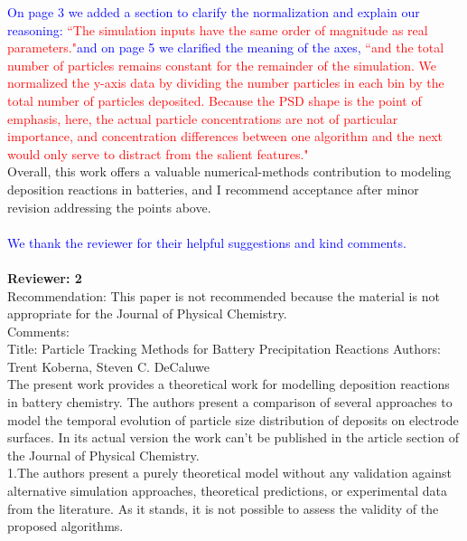 \documentclass[12 pt]{article}    %
\begin{document}
\noindent\textcolor{blue}{On page 3 we added a section to clarify the normalization and explain our reasoning:} \textcolor{red}{``The simulation inputs have the same order of magnitude as real parameters."}\textcolor{blue}{and on page 5 we clarified the meaning of the axes,}\textcolor{red}{ ``and the total number of particles remains constant for the remainder of the simulation. We normalized the y-axis data by dividing the number particles in each bin by the total number of particles deposited. Because the PSD shape is the point of emphasis, here, the actual particle concentrations are not of particular importance, and concentration differences between one algorithm and the next would only serve to distract from the salient features."}
\\

\noindent Overall, this work offers a valuable numerical-methods contribution to modeling deposition reactions in batteries, and I recommend acceptance after minor revision addressing the points above. \\ \\
\noindent\textcolor{blue}{We thank the reviewer for their helpful suggestions and kind comments.}\\ \\

\noindent \textbf{Reviewer: 2}  \\

\noindent Recommendation: This paper is not recommended because the material is not appropriate for the Journal of Physical Chemistry. \\

\noindent Comments: \\
Title: Particle Tracking Methods for Battery Precipitation Reactions
Authors: Trent Koberna, Steven C. DeCaluwe \\
The present work provides a theoretical work for modelling deposition reactions in battery chemistry. The authors present a comparison of several approaches to model the temporal evolution of particle size distribution of deposits on electrode surfaces. In its actual version the work can’t be published in the article section of the Journal of Physical Chemistry. \\

\noindent1.The authors present a purely theoretical model without any validation against alternative simulation approaches, theoretical predictions, or experimental data from the literature. As it stands, it is not possible to assess the validity of the proposed algorithms. \\
\end{document}
